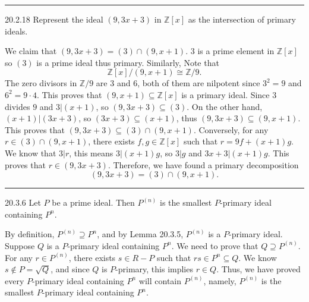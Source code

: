 \documentclass[letterpaper, 12pt]{article}
\begin{document}
\noindent\rule{7in}{2.8pt}
\begin{problem}{20.2.18}
Represent the ideal \((9,3x+3)\) in \(\mathbb{Z}[x]\) as the intersection of primary ideals.
\end{problem}
\begin{solution}
We claim that \((9,3x+3)=(3)\cap (9,x+1)\). \(3\) is a prime element in \(\mathbb{Z}[x]\) so \((3)\) is a prime ideal thus primary. Similarly, Note that 
\[\mathbb{Z}[x]/(9,x+1)\cong \mathbb{Z}/9.\]
The zero divisors in \(\mathbb{Z}/9\) are \(3\) and \(6\), both of them are nilpotent since \(3^2=9\) and \(6^2=9\cdot 4\). This proves that \((9,x+1)\subseteq \mathbb{Z}[x]\) is a primary ideal. Since \(3\) divides \(9\) and \(3|(x+1)\), so \((9,3x+3)\subseteq (3)\). On the other hand, \((x+1)|(3x+3)\), so \((3x+3)\subseteq (x+1)\), thus \((9,3x+3)\subseteq (9,x+1)\). This proves that \((9,3x+3)\subseteq (3)\cap (9,x+1)\). Conversely, for any \(r\in (3)\cap (9,x+1)\), there exists \(f,g\in \mathbb{Z}[x]\) such that \(r=9f+(x+1)g\). We know that \(3|r\), this means \(3|(x+1)g\), so \(3|g\) and \(3x+3|(x+1)g\). This proves that \(r\in (9,3x+3)\). Therefore, we have found a primary decomposition 
\[(9,3x+3)=(3)\cap (9,x+1).\]
\end{solution}

\noindent\rule{7in}{2.8pt}
\begin{problem}{20.3.6}
Let \(P\) be a prime ideal. Then \(P^{(n)}\) is the smallest \(P\)-primary ideal containing \(P^n\).
\end{problem}
\begin{solution}
By definition, \(P^{(n)}\supseteq P^n\), and by Lemma 20.3.5, \(P^{(n)}\) is a \(P\)-primary ideal. Suppose \(Q\) is a \(P\)-primary ideal containing \(P^n\). We need to prove that \(Q\supseteq P^{(n)}\). For any \(r\in P^{(n)}\), there exists \(s\in R-P\) such that \(rs\in P^n\subseteq Q\). We know \(s\notin P=\sqrt{Q}\), and since \(Q\) is \(P\)-primary, this implies \(r\in Q\). Thus, we have proved every \(P\)-primary ideal containing \(P^n\) will contain \(P^{(n)}\), namely, \(P^{(n)}\) is the smallest \(P\)-primary ideal containing \(P^n\).
\end{solution}
\end{document}
